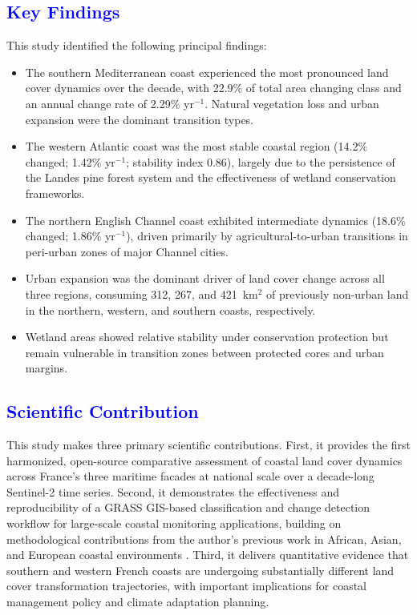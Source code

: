 \documentclass[coasts,article,submit,pdftex,moreauthors]{Definitions/mdpi}
\begin{document}
\subsection{\textcolor{blue}{Key Findings}}

This study identified the following principal findings:

\begin{itemize}
\item The southern Mediterranean coast experienced the most pronounced land cover dynamics over the decade, with 22.9\% of total area changing class and an annual change rate of 2.29\% yr$^{-1}$. Natural vegetation loss and urban expansion were the dominant transition types.

\item The western Atlantic coast was the most stable coastal region (14.2\% changed; 1.42\% yr$^{-1}$; stability index 0.86), largely due to the persistence of the Landes pine forest system and the effectiveness of wetland conservation frameworks.

\item The northern English Channel coast exhibited intermediate dynamics (18.6\% changed; 1.86\% yr$^{-1}$), driven primarily by agricultural-to-urban transitions in peri-urban zones of major Channel cities.

\item Urban expansion was the dominant driver of land cover change across all three regions, consuming 312, 267, and 421~km$^2$ of previously non-urban land in the northern, western, and southern coasts, respectively.

\item Wetland areas showed relative stability under conservation protection but remain vulnerable in transition zones between protected cores and urban margins.
\end{itemize}

\subsection{\textcolor{blue}{Scientific Contribution}}

This study makes three primary scientific contributions. First, it provides the first harmonized, open-source comparative assessment of coastal land cover dynamics across France's three maritime facades at national scale over a decade-long Sentinel-2 time series. Second, it demonstrates the effectiveness and reproducibility of a GRASS GIS-based classification and change detection workflow for large-scale coastal monitoring applications, building on methodological contributions from the author's previous work in African, Asian, and European coastal environments \citep{jmse12081279,jimaging11080249}. Third, it delivers quantitative evidence that southern and western French coasts are undergoing substantially different land cover transformation trajectories, with important implications for coastal management policy and climate adaptation planning.
\end{document}
